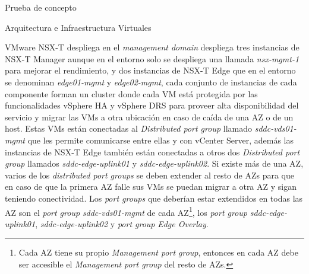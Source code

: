 \begin{section}{Prueba de concepto}
\begin{subsection}{Arquitectura e Infraestructura Virtuales\cite{CFVirtInfraes}}

VMware NSX-T despliega en el \textit{management domain} despliega tres instancias de NSX-T Manager aunque en el entorno solo se despliega una llamada \textit{nsx-mgmt-1} para mejorar el rendimiento, y dos instancias de NSX-T Edge que en el entorno se denominan \textit{edge01-mgmt} y \textit{edge02-mgmt}, cada conjunto de instancias de cada componente forman un cluster donde cada VM está protegida por las funcionalidades vSphere HA y vSphere DRS para proveer alta disponibilidad del servicio y migrar las VMs a otra ubicación en caso de caída de una AZ o de un host. Estas VMs están conectadas al \textit{Distributed port group} llamado \textit{sddc-vds01-mgmt} que les permite comunicarse entre ellas y con vCenter Server, además las instancias de NSX-T Edge también están conectadas a otros dos \textit{Distributed port group} llamados \textit{sddc-edge-uplink01} y \textit{sddc-edge-uplink02}. Si existe más de una AZ, varios de los \textit{distributed port groups} se deben extender al resto de AZs para que en caso de que la primera AZ falle sus VMs se puedan migrar a otra AZ y sigan teniendo conectividad. Los \textit{port groups} que deberían estar extendidos en todas las AZ son el \textit{port group} \textit{sddc-vds01-mgmt} de cada AZ\footnote{Cada AZ tiene su propio \textit{Management port group}, entonces en cada AZ debe ser accesible el \textit{Management port group} del resto de AZs.}, los \textit{port group} \textit{sddc-edge-uplink01}, \textit{sddc-edge-uplink02} y \textit{port group} \textit{Edge Overlay}.


\end{subsection}
\end{section}
